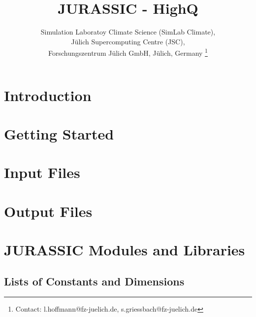 \documentclass[12pt,a4paper,titlepage,twoside]{article}
\begin{document}

\author{Simulation Laboratoy Climate Science (SimLab Climate),\\
  J\"u{}lich Supercomputing Centre (JSC),\\ Forschungszentrum J\"u{}lich GmbH, J\"u{}lich, Germany \footnote{Contact: l.hoffmann@fz-juelich.de, s.griessbach@fz-juelich.de}}
\title{JURASSIC - HighQ}

\maketitle
\tableofcontents
\clearpage

\section{Introduction}

\clearpage

\section{Getting Started}

\clearpage

\section{Input Files}
\label{sec:Input}

\clearpage

\section{Output Files}
\label{sec:Output}

\clearpage

\section{JURASSIC Modules and Libraries}
\label{sec:Modules}

\clearpage

\begin{appendix}
\section{Lists of Constants and Dimensions}

\end{appendix}

\clearpage
{}



%
\end{document}
